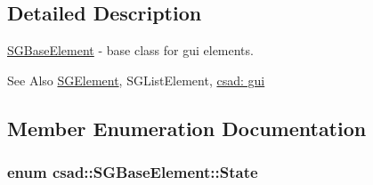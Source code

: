 \subsection{Detailed Description}
\hyperlink{classcsad_1_1_s_g_base_element}{S\-G\-Base\-Element} -\/ base class for gui elements. 

\begin{DoxySeeAlso}{See Also}
\hyperlink{classcsad_1_1_s_g_element}{S\-G\-Element}, S\-G\-List\-Element, \hyperlink{group__scenegui}{csad\-: gui} 
\end{DoxySeeAlso}


\subsection{Member Enumeration Documentation}
\hypertarget{classcsad_1_1_s_g_base_element_ab936ff0f0f69ecf8b67d60e53ae30cd0}{
\subsubsection[{State}]{\setlength{\rightskip}{0pt plus 5cm}enum {\bf csad\-::\-S\-G\-Base\-Element\-::\-State}}}\label{classcsad_1_1_s_g_base_element_ab936ff0f0f69ecf8b67d60e53ae30cd0}
